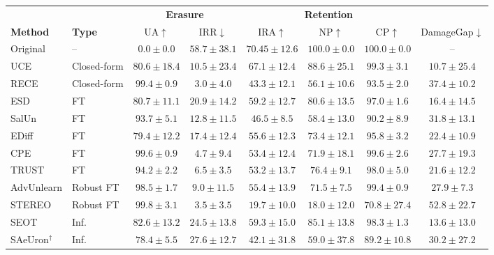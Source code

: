 \begin{table}[t]
\centering
\small
\setlength{\tabcolsep}{2.5pt}
\begin{tabular}{llcccccc}
\toprule
& & \multicolumn{2}{c}{\textbf{Erasure}} & \multicolumn{3}{c}{\textbf{Retention}} & \\
\cmidrule(lr){3-4} \cmidrule(lr){5-7}
\textbf{Method} & \textbf{Type} & UA$\uparrow$ & IRR$\downarrow$ & IRA$\uparrow$ & NP$\uparrow$ & CP$\uparrow$ & DamageGap$\downarrow$ \\
\midrule
Original    & --  & $0.0 \pm 0.0$ & $58.7 \pm 38.1$  & $70.45 \pm 12.6$  & $100.0 \pm 0.0$   & $100.0 \pm 0.0$   & -- \\
\midrule
UCE    & Closed-form & $80.6 \pm 18.4$ & $10.5 \pm 23.4$ & $67.1 \pm 12.4$ & $88.6 \pm 25.1$ & $99.3 \pm 3.1$  & $10.7 \pm 25.4$ \\
RECE   & Closed-form & $99.4 \pm 0.9$  & $3.0 \pm 4.0$   & $43.3 \pm 12.1$ & $56.1 \pm 10.6$  & $93.5 \pm 2.0$  & $37.4 \pm 10.2$ \\
\midrule
ESD     & FT  & $80.7 \pm 11.1$  & $20.9 \pm 14.2$  & $59.2 \pm 12.7$  & $80.6 \pm 13.5$  & $97.0 \pm 1.6$  & $16.4 \pm 14.5$  \\
SalUn   & FT  & $93.7 \pm 5.1$  & $12.8 \pm 11.5$  & $46.5 \pm 8.5$  & $58.4 \pm 13.0$  & $90.2 \pm 8.9$  & $31.8 \pm 13.1$  \\
EDiff   & FT  & $79.4 \pm 12.2$  & $17.4 \pm 12.4$  & $55.6 \pm 12.3$  & $73.4 \pm 12.1$  & $95.8 \pm 3.2$  & $22.4 \pm 10.9$  \\
CPE    & FT          & $99.6 \pm 0.9$  & $4.7 \pm 9.4$   & $53.4 \pm 12.4$ & $71.9 \pm 18.1$  & $99.6 \pm 2.6$ & $27.7 \pm 19.3$ \\
TRUST    & FT          & $94.2 \pm 2.2$  & $6.5 \pm 3.5$   & $53.2 \pm 13.7$ & $76.4 \pm 9.1$  & $98.0 \pm 5.0$ & $21.6 \pm 12.2$ \\
\midrule
AdvUnlearn & Robust FT   & $98.5 \pm 1.7$  & $9.0 \pm 11.5$   & $55.4 \pm 13.9$  & $71.5 \pm 7.5$ & $99.4 \pm 0.9$  & $27.9 \pm 7.3$  \\
STEREO  & Robust FT & $99.8 \pm 3.1$  & $3.5 \pm 3.5$   & $19.7 \pm 10.0$  & $18.0 \pm 12.0$  & $70.8 \pm 27.4$  & $52.8 \pm 22.7$  \\
\midrule
SEOT    & Inf. & $82.6 \pm 13.2$  & $24.5 \pm 13.8$  & $59.3 \pm 15.0$  & $85.1 \pm 13.8$  & $98.3 \pm 1.3$ & $13.6 \pm 13.0$  \\
SAeUron$^\dagger$ & Inf. & $78.4 \pm 5.5$ & $27.6 \pm 12.7$ & $42.1 \pm 31.8$ & $59.0 \pm 37.8$ & $89.2 \pm 10.8$ & $30.2 \pm 27.2$  \\

\end{tabular}
\end{table}
